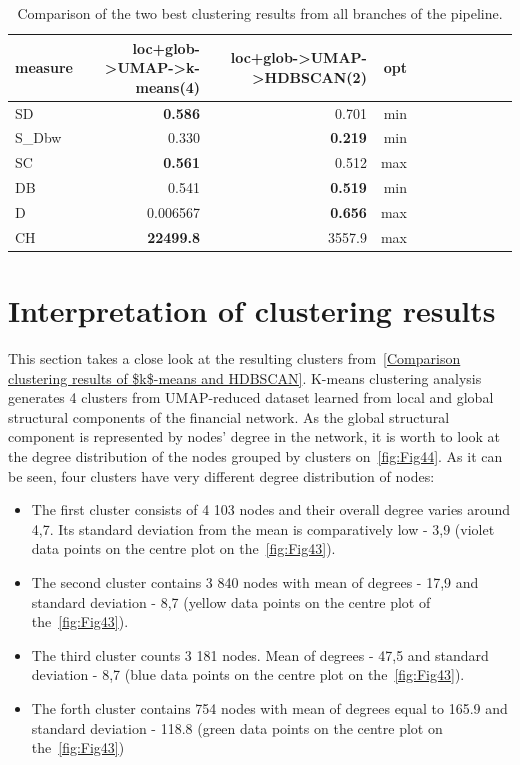 \begin{table}
\begin{center}
\small
\begin{tabular}{lrrrrrrrrrr}
\hline
measure & loc+glob->UMAP->k-means(4) & loc+glob->UMAP->HDBSCAN(2) & opt\\
\hline
SD      & \textbf{0.586} & 0.701 & min \\
S\_Dbw  & 0.330 & \textbf{0.219} & min \\
SC      & \textbf{0.561} & 0.512 & max \\
DB      & 0.541 & \textbf{0.519} & min \\
D       & 0.006567 & \textbf{0.656} & max\\
CH      & \textbf{22499.8} & 3557.9 & max \\
\hline
\end{tabular}
\caption {Comparison of the two best clustering results from all branches of the pipeline.}
\label{tab:tab7}
\end{center}
\end {table}

\section{Interpretation of clustering results}
This section takes a close look at the resulting clusters from~\ref{Comparison clustering results of $k$-means and HDBSCAN}. K-means clustering analysis generates 4 clusters from UMAP-reduced dataset learned from local and global structural components of the financial network. As the global structural component is represented by nodes' degree in the network, it is worth to look at the degree distribution of the nodes grouped by clusters on~\autoref{fig:Fig44}. As it can be seen, four clusters have very different degree distribution of nodes: 
    \begin{itemize}
        \item The first cluster consists of 4 103 nodes and their overall degree varies around 4,7. Its standard deviation from the mean is comparatively low - 3,9 (violet data points on the centre plot on the~\autoref{fig:Fig43}).
        \item The second cluster contains 3 840 nodes with mean of degrees - 17,9 and standard deviation - 8,7 (yellow data points on the centre plot of the~\autoref{fig:Fig43}).
        \item The third cluster counts 3 181 nodes. Mean of degrees - 47,5 and standard deviation - 8,7 (blue data points on the centre plot on the~\autoref{fig:Fig43}).
        \item The forth cluster contains 754 nodes with mean of degrees equal to 165.9 and standard deviation - 118.8 (green data points on the centre plot on the~\autoref{fig:Fig43})
    \end{itemize}
    
